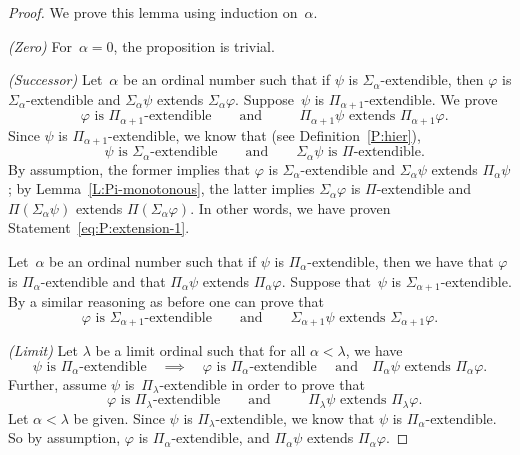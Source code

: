 \begin{proof}
We prove this lemma using induction on~$\alpha$.

\noindent\emph{(Zero)} For~$\alpha=0$, the proposition is trivial.

\noindent\emph{(Successor)} 
Let~$\alpha$ be an ordinal number such that
if $\psi$ is $\Sigma_\alpha$-extendible,
then
$\varphi$ is $\Sigma_\alpha$-extendible 
and $\Sigma_\alpha\psi$ extends $\Sigma_\alpha\varphi$.
Suppose~$\psi$
is $\Pi_{\alpha+1}$-extendible.
We prove
\begin{equation}
\label{eq:P:extension-1}
\text{ $\varphi$ is $\Pi_{\alpha+1}$-extendible}
\qquad\text{and}\qquad
\text{ $\Pi_{\alpha+1}\psi$ extends $\Pi_{\alpha+1}\varphi$.}
\end{equation}
Since $\psi$ is $\Pi_{\alpha+1}$-extendible,
we know that
(see Definition~\ref{P:hier}),
\begin{equation*}
\text{ $\psi$ is $\Sigma_\alpha$-extendible}
\qquad\text{and}\qquad
\text{$\Sigma_\alpha\psi$ is~$\Pi$-extendible}.
\end{equation*}
By assumption, 
the former implies that $\varphi$ is $\Sigma_\alpha$-extendible
and $\Sigma_\alpha\psi$ extends $\Pi_\alpha\psi$;
by Lemma~\ref{L:Pi-monotonous},
the latter implies $\Sigma_\alpha\varphi$
is $\Pi$-extendible
and $\Pi(\Sigma_\alpha\psi)$ extends $\Pi(\Sigma_\alpha \varphi)$.
In other words,
we have proven Statement~\eqref{eq:P:extension-1}.

Let~$\alpha$ be an ordinal number such that
if $\psi$ is $\Pi_\alpha$-extendible,
then we have that
$\varphi$ is $\Pi_\alpha$-extendible 
and that $\Pi_\alpha\psi$ extends $\Pi_\alpha\varphi$.
Suppose that~$\psi$
is $\Sigma_{\alpha+1}$-extendible.
By a similar reasoning
as before one can prove that
\begin{equation*}
\text{$\varphi$ is $\Sigma_{\alpha+1}$-extendible}
\qquad\text{and}\qquad
\text{$\Sigma_{\alpha+1}\psi$ extends $\Sigma_{\alpha+1}\varphi$.}
\end{equation*}

\noindent\emph{(Limit)}
Let $\lambda$ be a limit ordinal such that
for all $\alpha<\lambda$, we have
\begin{equation*}
\text{$\psi$ is $\Pi_\alpha$-extendible}
\quad\implies\quad
\text{$\varphi$ is $\Pi_\alpha$-extendible }
\quad\text{and}\quad
\text{$\Pi_\alpha\psi$ extends $\Pi_\alpha\varphi$.}
\end{equation*}
Further, 
assume $\psi$ is~$\Pi_\lambda$-extendible
in order to prove that
\begin{equation}
\label{eq:P:extension-2}
\text{ $\varphi$ is $\Pi_{\lambda}$-extendible}
\qquad\text{and}\qquad
\text{ $\Pi_{\lambda}\psi$ extends $\Pi_{\lambda}\varphi$.}
\end{equation}
Let $\alpha <\lambda$ be given.
Since $\psi$ is $\Pi_\lambda$-extendible,
we know that $\psi$ is $\Pi_\alpha$-extendible.
So by assumption, 
$\varphi$ is $\Pi_\alpha$-extendible,
and $\Pi_\alpha \psi$ extends $\Pi_\alpha \varphi$.


\end{proof}
